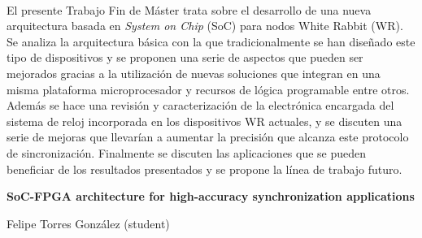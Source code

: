 \chapter*{}






\cleardoublepage
\thispagestyle{empty}

\begin{center}
{\large\bfseries \myTitle}\\
\end{center}
\begin{center}
\myName\\
\end{center}

\\

\vspace{0.7cm}
\\

El presente Trabajo Fin de Máster trata sobre el desarrollo de una nueva 
arquitectura basada en \textit{System on Chip} (SoC) para nodos White Rabbit 
(WR). 
Se analiza la arquitectura básica con la que tradicionalmente se han diseñado 
este tipo de dispositivos y se proponen una serie de aspectos que pueden ser 
mejorados gracias a la utilización de nuevas soluciones que integran en una  
misma plataforma microprocesador y recursos de lógica programable entre otros. 
Además se hace una revisión y caracterización de la electrónica encargada del 
sistema de reloj incorporada en los dispositivos WR actuales, y se discuten una 
serie de mejoras que llevarían a aumentar la precisión que alcanza este 
protocolo de sincronización. Finalmente se discuten las aplicaciones que se 
pueden beneficiar de los resultados presentados y se propone la línea de 
trabajo futuro.

\cleardoublepage


\thispagestyle{empty}


\begin{center}
{\large\bfseries SoC-FPGA architecture for high-accuracy synchronization 
applications}\\
\end{center}
\begin{center}
Felipe Torres González (student)\\
\end{center}

